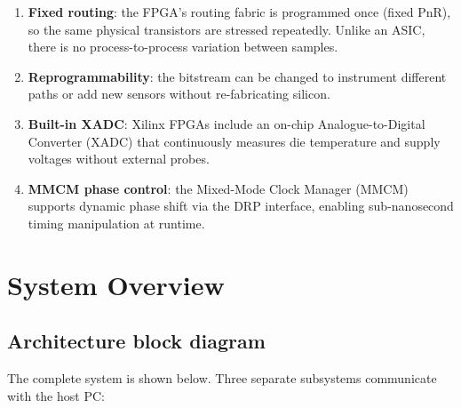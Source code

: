 \documentclass[12pt, a4paper]{report}
\begin{document}
\begin{enumerate}
  \item \textbf{Fixed routing}: the FPGA's routing fabric is programmed once (fixed PnR), so the
        same physical transistors are stressed repeatedly. Unlike an ASIC, there is no process-to-process
        variation between samples.
  \item \textbf{Reprogrammability}: the bitstream can be changed to instrument different paths or
        add new sensors without re-fabricating silicon.
  \item \textbf{Built-in XADC}: Xilinx FPGAs include an on-chip Analogue-to-Digital Converter (XADC)
        that continuously measures die temperature and supply voltages without external probes.
  \item \textbf{MMCM phase control}: the Mixed-Mode Clock Manager (MMCM) supports dynamic phase
        shift via the DRP interface, enabling sub-nanosecond timing manipulation at runtime.
\end{enumerate}

\chapter{System Overview}
\label{ch:system}

\section{Architecture block diagram}

The complete system is shown below. Three separate subsystems communicate with the host PC:
\end{document}
